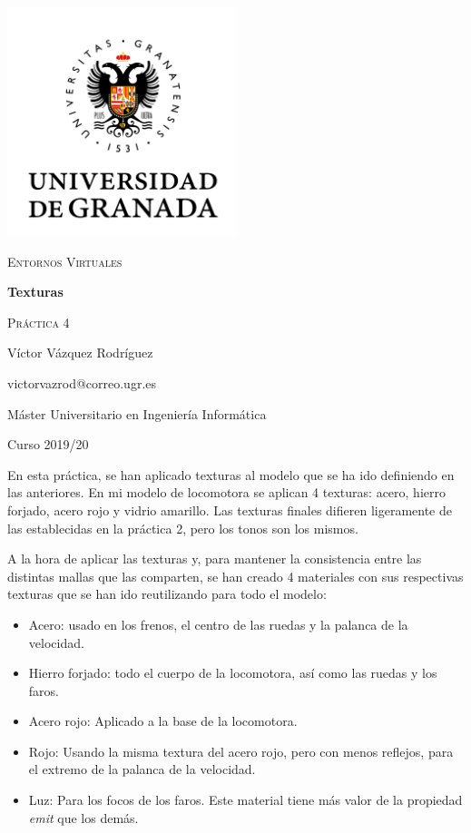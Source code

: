 \documentclass{article}
\begin{document}
\begin{titlepage}
    \centering
    \includegraphics[width=0.5\textwidth]{images/logo-ugr.png}\par
    \vspace{1cm}
    {\Large\scshape Entornos Virtuales \par}
    {\huge\bfseries Texturas \par}
    \vspace{0.2cm}
    {\scshape Práctica 4 \par}
    \vfill
    {\large Víctor Vázquez Rodríguez  \par}
    {victorvazrod@correo.ugr.es \par}
    \vfill
    {\large Máster Universitario en Ingeniería Informática \par}
    \vspace{0.2cm}
    {Curso 2019/20 \par}
\end{titlepage}

En esta práctica, se han aplicado texturas al modelo que se ha ido definiendo en
las anteriores. En mi modelo de locomotora se aplican 4 texturas: acero, hierro
forjado, acero rojo y vidrio amarillo. Las texturas finales difieren ligeramente
de las establecidas en la práctica 2, pero los tonos son los mismos.

A la hora de aplicar las texturas y, para mantener la consistencia entre las
distintas mallas que las comparten, se han creado 4 materiales con sus
respectivas texturas que se han ido reutilizando para todo el modelo:

\begin{itemize}
    \item Acero: usado en los frenos, el centro de las ruedas y la palanca de la
          velocidad.
    \item Hierro forjado: todo el cuerpo de la locomotora, así como las ruedas y
          los faros.
    \item Acero rojo: Aplicado a la base de la locomotora.
    \item Rojo: Usando la misma textura del acero rojo, pero con menos reflejos,
          para el extremo de la palanca de la velocidad.
    \item Luz: Para los focos de los faros. Este material tiene más valor de la
          propiedad \textit{emit} que los demás.
\end{itemize}
\end{document}

